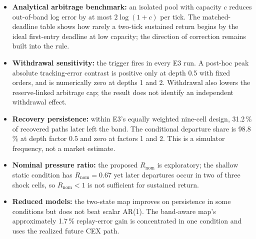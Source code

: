 \begin{itemize}
  \item \textbf{Analytical arbitrage benchmark:} an isolated pool with capacity $c$ reduces out-of-band log error by at most $2\log(1+c)$ per tick. The matched-deadline table shows how rarely a two-tick sustained return begins by the ideal first-entry deadline at low capacity; the direction of correction remains built into the rule.
  \item \textbf{Withdrawal sensitivity:} the trigger fires in every E3 run. A post-hoc peak absolute tracking-error contrast is positive only at depth 0.5 with fixed orders, and is numerically zero at depths 1 and 2. Withdrawal also lowers the reserve-linked arbitrage cap; the result does not identify an independent withdrawal effect.
  \item \textbf{Recovery persistence:} within E3's equally weighted nine-cell design, 31.2\,\% of recovered paths later left the band. The conditional departure share is 98.8\,\% at depth factor $0.5$ and zero at factors 1 and 2. This is a simulator frequency, not a market estimate.
  \item \textbf{Nominal pressure ratio:} the proposed $R_{\mathrm{nom}}$ is exploratory; the shallow static condition has $R_{\mathrm{nom}}=0.67$ yet later departures occur in two of three shock cells, so $R_{\mathrm{nom}}<1$ is not sufficient for sustained return.
  \item \textbf{Reduced models:} the two-state map improves on persistence in some conditions but does not beat scalar AR(1). The band-aware map's approximately 1.7\,\% replay-error gain is concentrated in one condition and uses the realized future CEX path.
\end{itemize}
